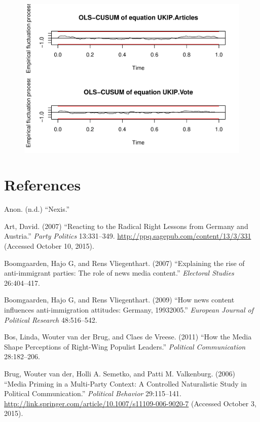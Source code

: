 \documentclass[12pt,article]{article}
\begin{document}
\pagebreak

\begin{figure}[htbp]
\centering
\includegraphics{ukip_media_files/figure-latex/supplementary-1.pdf}
\caption{}
\end{figure}

\pagebreak

\section{References}\label{references}

\raggedright

Anon. (n.d.) ``Nexis.''

Art, David. (2007) ``Reacting to the Radical Right Lessons from Germany
and Austria.'' \emph{Party Politics} 13:331--349.
\url{http://ppq.sagepub.com/content/13/3/331} (Accessed October 10,
2015).

Boomgaarden, Hajo G, and Rens Vliegenthart. (2007) ``Explaining the rise
of anti-immigrant parties: The role of news media content.''
\emph{Electoral Studies} 26:404--417.

Boomgaarden, Hajo G, and Rens Vliegenthart. (2009) ``How news content
influences anti-immigration attitudes: Germany, 19932005.''
\emph{European Journal of Political Research} 48:516--542.

Bos, Linda, Wouter van der Brug, and Claes de Vreese. (2011) ``How the
Media Shape Perceptions of Right-Wing Populist Leaders.''
\emph{Political Communication} 28:182--206.

Brug, Wouter van der, Holli A. Semetko, and Patti M. Valkenburg. (2006)
``Media Priming in a Multi-Party Context: A Controlled Naturalistic
Study in Political Communication.'' \emph{Political Behavior}
29:115--141.
\url{http://link.springer.com/article/10.1007/s11109-006-9020-7}
(Accessed October 3, 2015).
\end{document}
